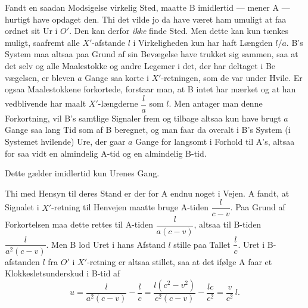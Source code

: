 \documentclass[12pt,a4paper]{article}
\newcommand{\opage}[1]{\marginnote{\footnotesize\textit{[#1]}}}
\begin{document}
Fandt en saadan Modsigelse virkelig Sted, maatte B imidlertid --- mener A ---
hurtigt have opdaget den. Thi det vilde jo da have været ham umuligt at faa
ordnet sit Ur i $O'$. Den kan derfor \emph{ikke} finde Sted. Men dette kan kun
tænkes muligt, saafremt alle $X'$-afstande $l$ i Virkeligheden kun har haft
Længden $l/a$. B's System maa altsaa paa Grund af sin Bevægelse have trukket
sig sammen, saa at det selv og alle Maalestokke og andre Legemer i det, der
har deltaget i Be\-%
\opage{11}vægelsen, er bleven $a$ Gange saa korte i $X'$-retningen, som de var
under Hvile. Er ogsaa Maalestokkene forkortede, forstaar man, at B intet
har mærket og at han vedblivende har maalt $X'$-længderne $\dfrac{l}{a}$
som $l$. Men antager man denne Forkortning, vil B's samtlige Signaler frem
og tilbage altsaa kun have brugt $a$ Gange saa lang Tid som af B beregnet,
og man faar da overalt i B's System (i Systemet hvilende) Ure, der gaar $a$
Gange for langsomt i Forhold til A's, altsaa for saa vidt en almindelig
A-tid og en almindelig B-tid.

Dette gælder imidlertid kun Urenes Gang.

Thi med Hensyn til deres Stand er der for A endnu noget i Vejen. A fandt,
at Signalet i $X'$-retning til Henvejen maatte bruge A-tiden
$\dfrac{l}{c-v}$. Paa Grund af Forkortelsen maa dette rettes til A-tiden
$\dfrac{l}{a(c-v)}$, altsaa til B-tiden $\dfrac{l}{a^{2}(c-v)}$. Men B lod
Uret i hans Afstand $l$ stille paa Tallet $\dfrac{l}{c}$. Uret i
B-afstanden $l$ fra $O'$ i $X'$-retning er altsaa stillet, saa at det
ifølge A faar et Klokkesletsunderskud i B-tid af
\begin{equation}\tag*{2.}
  u = \frac{l}{a^{2}(c-v)} - \frac{l}{c}
    = \frac{l(c^{2}-v^{2})}{c^{2}(c-v)} - \frac{lc}{c^{2}}
    = \frac{v}{c^{2}}\,l.
\end{equation}
\end{document}
